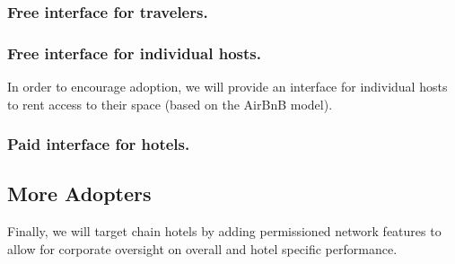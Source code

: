 \documentclass{article}
\begin{document}
\subsubsection{Free interface for travelers.}

\subsubsection{Free interface for individual hosts.}
In order to encourage adoption, we will provide an interface for individual hosts to rent access to their space (based on the AirBnB model).  

\subsubsection{Paid interface for hotels.}


\subsection{More Adopters}
Finally, we will target chain hotels by adding permissioned network features to allow for corporate oversight on overall and hotel specific performance.
\end{document}
